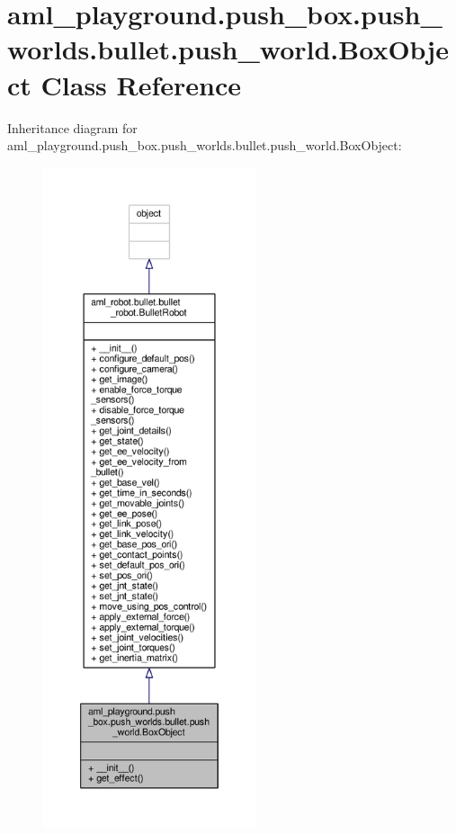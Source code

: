 \hypertarget{classaml__playground_1_1push__box_1_1push__worlds_1_1bullet_1_1push__world_1_1_box_object}{\section{aml\-\_\-playground.\-push\-\_\-box.\-push\-\_\-worlds.\-bullet.\-push\-\_\-world.\-Box\-Object Class Reference}
\label{classaml__playground_1_1push__box_1_1push__worlds_1_1bullet_1_1push__world_1_1_box_object}
}


Inheritance diagram for aml\-\_\-playground.\-push\-\_\-box.\-push\-\_\-worlds.\-bullet.\-push\-\_\-world.\-Box\-Object\-:
\nopagebreak
\begin{figure}[H]
\begin{center}
\leavevmode
\includegraphics[height=550pt]{classaml__playground_1_1push__box_1_1push__worlds_1_1bullet_1_1push__world_1_1_box_object__inherit__graph}
\end{center}
\end{figure}


